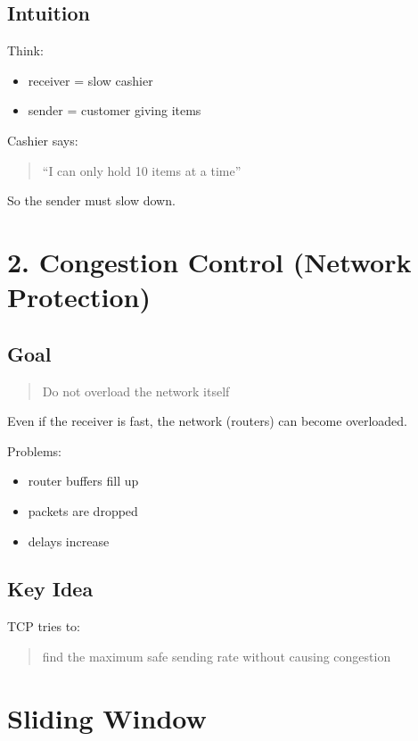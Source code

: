\subsection*{Intuition}

Think:
\begin{itemize}
    \item receiver = slow cashier
    \item sender = customer giving items
\end{itemize}

Cashier says:

\begin{quote}
“I can only hold 10 items at a time”
\end{quote}

So the sender must slow down.

\section{2. Congestion Control (Network Protection)}

\subsection*{Goal}

\begin{quote}
Do not overload the network itself
\end{quote}

Even if the receiver is fast, the network (routers) can become overloaded.

Problems:
\begin{itemize}
    \item router buffers fill up
    \item packets are dropped
    \item delays increase
\end{itemize}

\subsection*{Key Idea}

TCP tries to:

\begin{quote}
find the maximum safe sending rate without causing congestion
\end{quote}

\section{Sliding Window}

